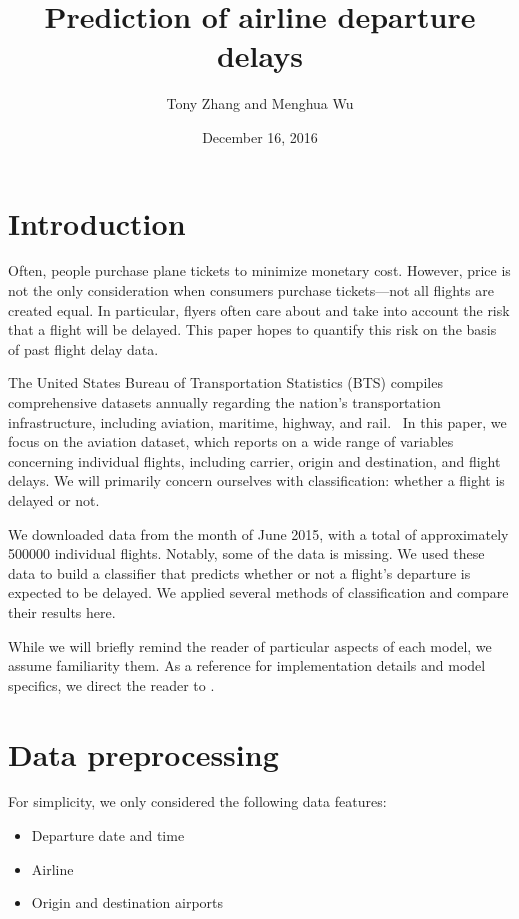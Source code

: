 \documentclass{article}
\title{Prediction of airline departure delays}
\author{Tony Zhang and Menghua Wu}
\date{December 16, 2016}
\begin{document}
\maketitle

\begin{multicols}{2}


\section{Introduction}

Often, people purchase plane tickets
to minimize monetary cost.
However, price is not the only consideration
when consumers purchase tickets---not
all flights are created equal.
In particular,
flyers often care about and take into account
the risk that a flight will be delayed.
This paper hopes to quantify this risk
on the basis of past flight delay data.

The United States Bureau of Transportation Statistics (BTS)
compiles comprehensive datasets annually
regarding the nation's transportation infrastructure,
including aviation, maritime, highway, and rail.~\cite{bts}
In this paper, we focus on the aviation dataset,
which reports on a wide range of variables concerning individual flights,
including carrier, origin and destination, and flight delays.
We will primarily concern ourselves with classification:
whether a flight is delayed or not.

We downloaded data from the month of June 2015,
with a total of approximately 500000 individual flights.
Notably, some of the data is missing.
We used these data to build a classifier
that predicts whether or not a flight's departure
is expected to be delayed.
We applied several methods of classification
and compare their results here.

While we will briefly remind the reader
of particular aspects of each model,
we assume familiarity them.
As a reference for implementation details and model specifics,
we direct the reader to \cite{sklearn-ug}.

\section{Data preprocessing}

For simplicity,
we only considered the following data features:
\begin{itemize}
    \item
    Departure date and time
    \item
    Airline
    \item
    Origin and destination airports
\end{itemize}


\end{multicols}
\end{document}
